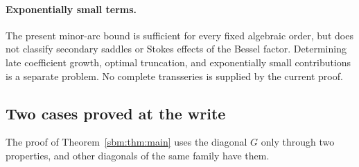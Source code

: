 \documentclass[11pt,letterpaper]{article}
\numberwithin{equation}{section}
\theoremstyle{remark}\newtheorem{remark}[theorem]{Remark}
\begin{document}
\paragraph{Exponentially small terms.}
The present minor-arc bound is sufficient for every fixed algebraic
order, but does not classify secondary saddles or Stokes effects of
the Bessel factor. Determining late coefficient growth, optimal
truncation, and exponentially small contributions is a separate
problem. No complete transseries is supplied by the current proof.

\subsection*{Two cases proved at the write}
The proof of Theorem~\ref{sbm:thm:main} uses the diagonal $G$ only through
two properties, and other diagonals of the same family have them.
\end{document}
